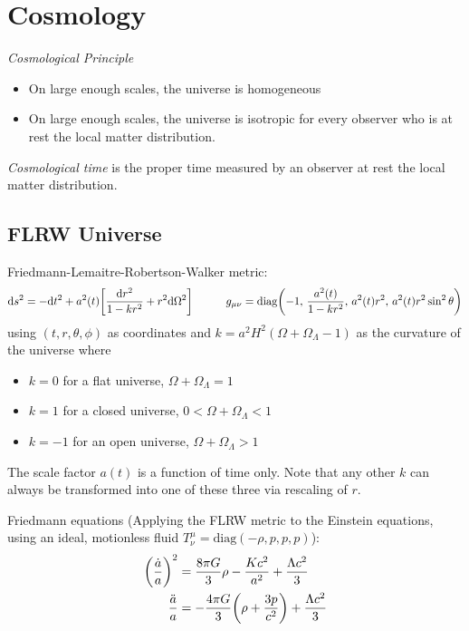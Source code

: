 \section{Cosmology}
	\emph{Cosmological Principle}
	\begin{itemize}
		\item On large enough scales, the universe is homogeneous
		\item On large enough scales, the universe is isotropic for every observer who is at rest \wrt the local matter distribution.
	\end{itemize}

	\noindent
	\emph{Cosmological time} is the proper time measured by an observer at rest \wrt the local matter distribution.

	\subsection{FLRW Universe}
		Friedmann-Lemaitre-Robertson-Walker metric:
		\begin{equation}
			\dd s^2 = -\dd t^2 + a^2(t) \qty[\frac{\dd r^2}{1-kr^2} + r^2 \dd \Omega^2]
			\hspace{30pt}
			g_{\mu\nu} = \mathrm{diag}\qty(-1,\, \frac{a^2(t)}{1-kr^2},\, a^2(t) r^2,\, a^2(t) r^2 \sin^2 \theta)
		\end{equation}
		using $(t, r, \theta, \phi)$ as coordinates and $k = a^2 H^2 ( \Omega + \Omega_\Lambda - 1)$ as the curvature of the universe where
		\begin{itemize}
			\item $k=0$ for a flat universe, \ie $\Omega + \Omega_\Lambda = 1$
			\item $k=1$ for a closed universe, \ie $0 < \Omega + \Omega_\Lambda < 1$
			\item $k=-1$ for an open universe, \ie $\Omega + \Omega_\Lambda > 1$
		\end{itemize}
		The scale factor $a(t)$ is a function of time only. Note that any other $k$ can always be transformed into one of these three via rescaling of $r$.

		\noindent
		Friedmann equations (Applying the FLRW metric to the Einstein equations, using an ideal, motionless fluid $T^\mu_\nu = \text{diag}(-\rho, p, p, p)$):
		\begin{equation}
			\begin{aligned}
				\qty(\frac{\dot{a}}{a})^2 &= \frac{8 \pi G}{3} \rho - \frac{K c^2}{a^2} + \frac{\Lambda c^2}{3} \\
				\frac{\ddot{a}}{a} &= -\frac{4 \pi G}{3} \qty(\rho + \frac{3p}{c^2}) + \frac{\Lambda c^2}{3} \\
			\end{aligned}
		\end{equation}

